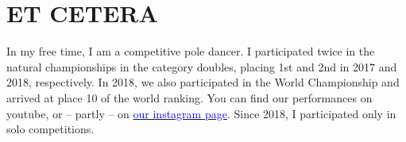 \section{ET CETERA}

In my free time, I am a competitive pole dancer. 
I participated twice in the natural championships in the category doubles, placing 1st and 2nd in 2017 and 2018, respectively. 
In 2018, we also participated in the World Championship and arrived at place 10 of the world ranking. 
You can find our performances on youtube, or -- partly -- on \href{https://instagram.com/duo_polenotti}{\textcolor{blue}{our instagram page}}. Since 2018, I participated only in solo competitions.
